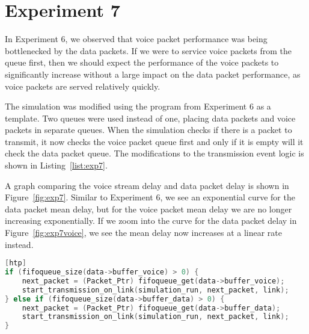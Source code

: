 \section*{Experiment 7}
In Experiment 6, we observed that voice packet performance was being bottlenecked by the data packets. If we were to service voice packets from the queue first, then we should expect the performance of the voice packets to significantly increase without a large impact on the data packet performance, as voice packets are served relatively quickly.

The simulation was modified using the program from Experiment 6 as a template. Two queues were used instead of one, placing data packets and voice packets in separate queues. When the simulation checks if there is a packet to transmit, it now checks the voice packet queue first and only if it is empty will it check the data packet queue. The modifications to the transmission event logic is shown in Listing~\ref{list:exp7}.

A graph comparing the voice stream delay and data packet delay is shown in Figure~\ref{fig:exp7}. Similar to Experiment 6, we see an exponential curve for the data packet mean delay, but for the voice packet mean delay we are no longer increasing exponentially. If we zoom into the curve for the data packet delay in Figure~\ref{fig:exp7voice}, we see the mean delay now increases at a linear rate instead.

\begin{lstlisting}[language=C, caption={Modifications to Experiment 7 Code}, label={list:exp7}][htp]
if (fifoqueue_size(data->buffer_voice) > 0) {
	next_packet = (Packet_Ptr) fifoqueue_get(data->buffer_voice);
	start_transmission_on_link(simulation_run, next_packet, link);
} else if (fifoqueue_size(data->buffer_data) > 0) {
	next_packet = (Packet_Ptr) fifoqueue_get(data->buffer_data);
	start_transmission_on_link(simulation_run, next_packet, link);
}
\end{lstlisting}

